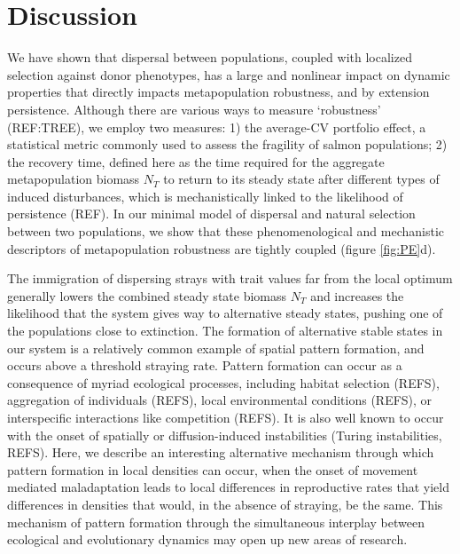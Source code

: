 \documentclass[twocolumn,preprintnumbers,amsmath,amssymb,superscriptaddress]{revtex4}
\begin{document}



\section{Discussion}

We have shown that dispersal between populations, coupled with localized selection against donor phenotypes, has a large and nonlinear impact on dynamic properties that directly impacts metapopulation robustness, and by extension persistence.
Although there are various ways to measure `robustness' (REF:TREE), we employ two measures: 
1) the average-CV portfolio effect, a statistical metric commonly used to assess the fragility of salmon populations; 
2) the recovery time, defined here as the time required for the aggregate metapopulation biomass $N_T$ to return to its steady state after different types of induced disturbances, which is mechanistically linked to the likelihood of persistence (REF).
In our minimal model of dispersal and natural selection between two populations, we show that these phenomenological and mechanistic descriptors of metapopulation robustness are tightly coupled (figure \ref{fig:PE}d).

The immigration of dispersing strays with trait values far from the local optimum generally lowers the combined steady state biomass $N_T$ and increases the likelihood that the system gives way to alternative steady states, pushing one of the populations close to extinction.
The formation of alternative stable states in our system is a relatively common example of spatial pattern formation, and occurs above a threshold straying rate.
Pattern formation can occur as a consequence of myriad ecological processes, including habitat selection (REFS), aggregation of individuals (REFS), local environmental conditions (REFS), or interspecific interactions like competition (REFS). 
It is also well known to occur with the onset of spatially or diffusion-induced instabilities (Turing instabilities, REFS). 
Here, we describe an interesting alternative mechanism through which pattern formation in local densities can occur, when the onset of movement mediated maladaptation leads to local differences in reproductive rates that yield differences in densities that would, in the absence of straying, be the same. 
This mechanism of pattern formation through the simultaneous interplay between ecological and evolutionary dynamics may open up new areas of research.
\end{document}
